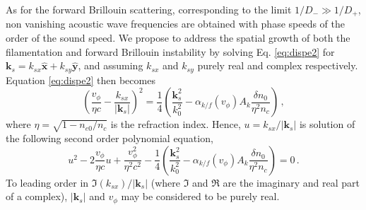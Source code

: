 \documentclass[
 reprint,
 amsmath,amssymb,
 aps,
]{revtex4-1}
\begin{document}
As for the forward Brillouin scattering,  corresponding to the limit $1/D_-\gg1/D_+$, non vanishing acoustic wave frequencies are obtained with  phase speeds of the order of the sound speed. We propose to address the spatial growth of both the filamentation and forward Brillouin instability  by solving Eq. \eqref{eq:dispe2} for  $\mathbf{k}_s = k_{sx} \hat{\mathbf{x}} +k_{sy} \hat{\mathbf{y}}$, and assuming 
$ k_{sx}$ and $k_{sy}$ purely real and complex respectively. Equation \eqref{eq:dispe2} then becomes 
\begin{equation}\label{eq:dispe3} 
\left(\frac{v_\phi}{\eta c} - 
\frac{ k_{sx}}{\vert \mathbf{k}_s\vert }\right)^2
=\frac{1}{4} \left( \frac{\mathbf{k}_s^2}{k_0^2} - \alpha_{k/f}(v_\phi)A_k\frac{\delta n_0}{\eta^2n_c} \right) 
\, ,
\end{equation}
where $\eta=\sqrt{1-n_{e0}/n_c}$ is the refraction index.
Hence, $u =  k_{sx}/\vert \mathbf{k}_s\vert $ is solution of the following second order polynomial equation, 
\begin{equation}\label{eq:dispe2poly} 
u^2 -2\frac{v_\phi}{\eta c}u +\frac{v_\phi^2}{\eta^2 c^2}-\frac{1}{4}\left( \frac{\mathbf{k}_s^2}{k_0^2} - \alpha_{k/f}(v_\phi)A_k\frac{\delta n_0}{\eta^2n_c} \right) =0 
\, .
\end{equation}
To leading order in  $\Im(k_{sx})/\vert \mathbf{k}_s\vert $ (where $\Im$ and $\Re$ are the imaginary and real part of a complex), $\vert \mathbf{k}_s\vert$ and $v_\phi$ may be considered to be purely real.
\end{document}
